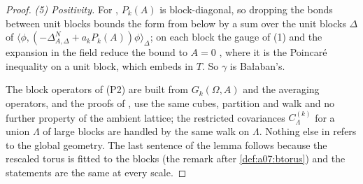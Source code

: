 \begin{proof}
\emph{(5) Positivity.} For \cite[(1.8)]{Ba4}, $P_k(A)$ is block-diagonal, so dropping the bonds between unit blocks bounds the form from below by a sum over the unit blocks $\Delta$ of $\langle\phi,(-\Delta^N_{A,\Delta}+a_kP_k(A))\phi\rangle_\Delta$; on each block the gauge of (1) and the expansion in the field reduce the bound to $A=0$ \cite[p.~580]{Ba4}, where it is the Poincar\'e inequality on a unit block, which embeds in $T$. So $\gamma$ is Ba{\l}aban's.

The block operators of (P2) are built from $G_k(\Omega,A)$ and the averaging operators, and the proofs of \cite[Props.~2.2--2.3]{Ba1}, \cite[Sect.~3]{Ba4} use the same cubes, partition and walk and no further property of the ambient lattice; the restricted covariances $C^{(k)}_\Lambda$ for a union $\Lambda$ of large blocks are handled by the same walk on $\Lambda$. Nothing else in \cite[Sects.~2--3]{Ba4} refers to the global geometry. The last sentence of the lemma follows because the rescaled torus is fitted to the blocks (the remark after \cref{def:a07:btorus}) and the statements are the same at every scale.
\end{proof}

